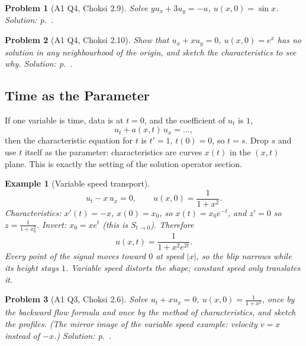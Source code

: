 \documentclass{article}
\newtheorem{problem}{Problem}
\newtheorem*{example}{Example}
\begin{document}
\begin{problem}[A1 Q4, Choksi 2.9]\label{prob:a1-29}
    Solve $yu_x + 3u_y = -u$, $u(x,0) = \sin x$.
    \hfill \emph{Solution: p.~\pageref{sol:a1-29}.}
\end{problem}
\begin{problem}[A1 Q4, Choksi 2.10]\label{prob:a1-210}
    Show that $u_x + xu_y = 0$, $u(x,0) = e^x$ has no solution in any neighbourhood of the origin, and sketch the characteristics to see why.
    \hfill \emph{Solution: p.~\pageref{sol:a1-210}.}
\end{problem}

\subsection{Time as the Parameter}
If one variable is time, data is at $t = 0$, and the coefficient of $u_t$ is $1$,
\begin{equation}
    u_t + a(x,t)\, u_x = \dots,
\end{equation}
then the characteristic equation for $t$ is $t' = 1$, $t(0) = 0$, so $t = s$. Drop $s$ and use $t$ itself as the parameter: characteristics are curves $x(t)$ in the $(x,t)$ plane. This is exactly the setting of the solution operator section.
\begin{example}[Variable speed transport]
    \begin{equation}
        u_t - x\,u_x = 0, \qquad u(x,0) = \frac{1}{1+x^2}.
    \end{equation}
    Characteristics: $x'(t) = -x$, $x(0) = x_0$, so $x(t) = x_0 e^{-t}$, and $z' = 0$ so $z = \frac{1}{1+x_0^2}$. Invert: $x_0 = x e^{t}$ (this is $S_{t\to0}$). Therefore
    \begin{equation}
        u(x,t) = \frac{1}{1 + x^2 e^{2t}}.
    \end{equation}
    Every point of the signal moves toward $0$ at speed $|x|$, so the blip narrows while its height stays $1$. Variable speed distorts the shape; constant speed only translates it.
\end{example}


\begin{problem}[A1 Q3, Choksi 2.6]\label{prob:a1-26}
    Solve $u_t + xu_x = 0$, $u(x,0) = \frac{1}{1+x^2}$, once by the backward flow formula and once by the method of characteristics, and sketch the profiles. (The mirror image of the variable speed example: velocity $v = x$ instead of $-x$.)
    \hfill \emph{Solution: p.~\pageref{sol:a1-26}.}
\end{problem}
\end{document}
